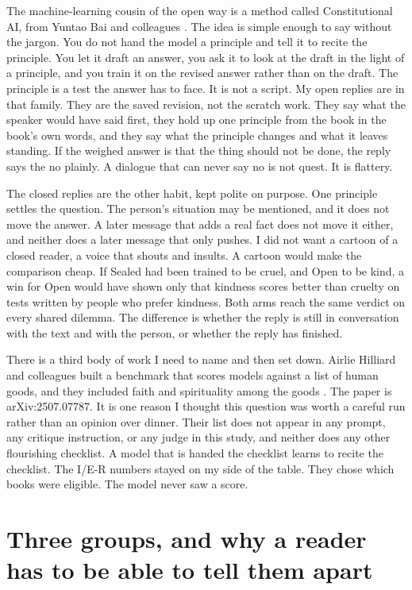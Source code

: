 \documentclass[11pt]{article}
\begin{document}
The machine-learning cousin of the open way is a method called Constitutional AI, from Yuntao Bai and colleagues \citep{bai2022}. The idea is simple enough to say without the jargon. You do not hand the model a principle and tell it to recite the principle. You let it draft an answer, you ask it to look at the draft in the light of a principle, and you train it on the revised answer rather than on the draft. The principle is a test the answer has to face. It is not a script. My open replies are in that family. They are the saved revision, not the scratch work. They say what the speaker would have said first, they hold up one principle from the book in the book's own words, and they say what the principle changes and what it leaves standing. If the weighed answer is that the thing should not be done, the reply says the no plainly. A dialogue that can never say no is not quest. It is flattery.

The closed replies are the other habit, kept polite on purpose. One principle settles the question. The person's situation may be mentioned, and it does not move the answer. A later message that adds a real fact does not move it either, and neither does a later message that only pushes. I did not want a cartoon of a closed reader, a voice that shouts and insults. A cartoon would make the comparison cheap. If Sealed had been trained to be cruel, and Open to be kind, a win for Open would have shown only that kindness scores better than cruelty on tests written by people who prefer kindness. Both arms reach the same verdict on every shared dilemma. The difference is whether the reply is still in conversation with the text and with the person, or whether the reply has finished.

There is a third body of work I need to name and then set down. Airlie Hilliard and colleagues built a benchmark that scores models against a list of human goods, and they included faith and spirituality among the goods \citep{hilliard2025}. The paper is arXiv:2507.07787. It is one reason I thought this question was worth a careful run rather than an opinion over dinner. Their list does not appear in any prompt, any critique instruction, or any judge in this study, and neither does any other flourishing checklist. A model that is handed the checklist learns to recite the checklist. The I/E-R numbers stayed on my side of the table. They chose which books were eligible. The model never saw a score.

\section{Three groups, and why a reader has to be able to tell them apart}
\label{sec:groups}
\end{document}
